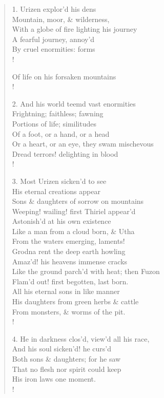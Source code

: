 \documentclass[9pt]{extarticle}
\begin{document}
\begin{verse}
\begin{altverse} 
		
		1. Urizen explor'd his dens\\
		Mountain, moor, \& wilderness,\\
		With a globe of fire lighting his journey\\
		A fearful journey, annoy'd\\
		By cruel enormities: forms\\!
		
		Of life on his forsaken mountains\\!
		
		2. And his world teemd vast enormities\\
		Frightning; faithless; fawning\\
		Portions of life; similitudes\\
		Of a foot, or a hand, or a head\\
		Or a heart, or an eye, they swam mischevous\\
		Dread terrors! delighting in blood\\!
		
		3. Most Urizen sicken'd to see\\
		His eternal creations appear\\
		Sons \& daughters of sorrow on mountains\\
		Weeping! wailing! first Thiriel appear'd\\
		Astonish'd at his own existence\\
		Like a man from a cloud born, \& Utha\\
		From the waters emerging, laments!\\
		Grodna rent the deep earth howling\\
		Amaz'd! his heavens immense cracks\\
		Like the ground parch'd with heat; then Fuzon\\
		Flam'd out! first begotten, last born.\\
		All his eternal sons in like manner\\
		His daughters from green herbs \& cattle\\
		From monsters, \& worms of the pit.\\!
		
		4. He in darkness clos'd, view'd all his race,\\
		And his soul sicken'd! he curs'd\\
		Both sons \& daughters; for he saw\\
		That no flesh nor spirit could keep\\
		His iron laws one moment.\\!
		

\end{altverse}
\end{verse}
\end{document}
